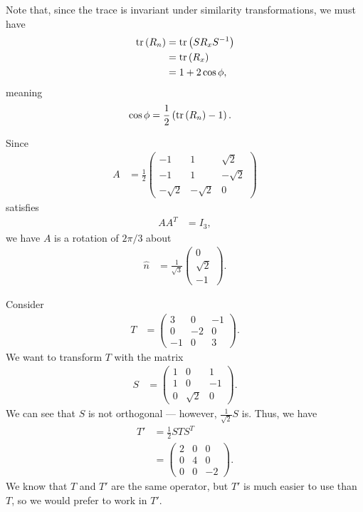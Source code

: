 \documentclass[10pt]{mypackage}
\begin{document}
Note that, since the trace is invariant under similarity transformations, we must have
\begin{align*}
  \tr\left(R_{n}\right) &= \tr\left(SR_{x}S^{-1}\right)\\
                        &= \tr\left(R_x\right)\\
                        &= 1 + 2\cos\phi,
\end{align*}
meaning
\begin{align*}
  \cos\phi &= \frac{1}{2}\left(\tr\left(R_{n}\right) - 1\right).
\end{align*}
\begin{example}
  Since
  \begin{align*}
    A &= \frac{1}{2} \begin{pmatrix}-1 & 1 & \sqrt{2} \\ -1 & 1 & -\sqrt{2} \\ -\sqrt{2} &-\sqrt{2} & 0\end{pmatrix}
  \end{align*}
  satisfies
  \begin{align*}
    AA^{T} &= I_{3},
  \end{align*}
  we have $A$ is a rotation of $2\pi/3$ about
  \begin{align*}
    \hat{n} &= \frac{1}{\sqrt{3}} \begin{pmatrix}0\\\sqrt{2}\\-1\end{pmatrix}.
  \end{align*}
\end{example}
\begin{example}
  Consider
  \begin{align*}
    T &= \begin{pmatrix}3 & 0 & -1\\0 & -2 & 0 \\ -1 & 0 & 3\end{pmatrix}.
  \end{align*}
  We want to transform $T$ with the matrix
  \begin{align*}
    S &= \begin{pmatrix}1 & 0 & 1 \\ 1 & 0 & -1 \\ 0 & \sqrt{2} & 0\end{pmatrix}.
  \end{align*}
  We can see that $S$ is not orthogonal --- however, $\frac{1}{\sqrt{2}}S$ is. Thus, we have
  \begin{align*}
    T' &= \frac{1}{2}STS^{T}\\
       &= \begin{pmatrix}2 & 0 & 0 \\ 0 & 4 & 0 \\ 0 & 0 & -2\end{pmatrix}.
  \end{align*}
  We know that $T$ and $T'$ are the same operator, but $T'$ is much easier to use than $T$, so we would prefer to work in $T'$.
\end{example}
\end{document}
